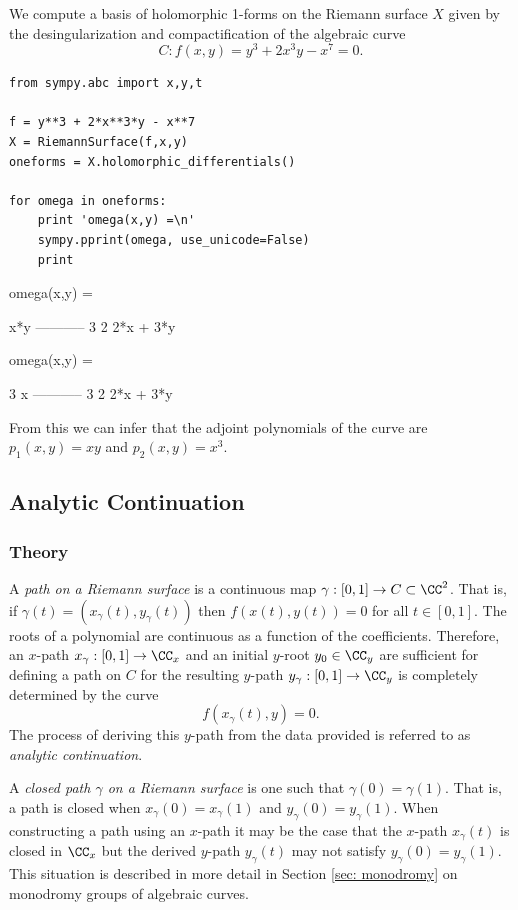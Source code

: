We compute a basis of holomorphic 1-forms on the Riemann surface $X$
given by the desingularization and compactification of the algebraic
curve
\[
    C : f(x,y) = y^3 + 2x^3y - x^7 = 0.
\]
\begin{lstlisting}
from sympy.abc import x,y,t

f = y**3 + 2*x**3*y - x**7
X = RiemannSurface(f,x,y)
oneforms = X.holomorphic_differentials()

for omega in oneforms:
    print 'omega(x,y) =\n'
    sympy.pprint(omega, use_unicode=False)
    print
\end{lstlisting}
\begin{pyoutput}
omega(x,y) =

    x*y    
-----------
   3      2
2*x  + 3*y 

omega(x,y) =

      3    
     x     
-----------
   3      2
2*x  + 3*y
\end{pyoutput}
From this we can infer that the adjoint polynomials of the curve are
$p_1(x,y) = xy$ and $p_2(x,y) = x^3$.


\subsection{Analytic Continuation} \label{sec: analytic-continuation}

%
\subsubsection*{Theory}
%

A {\it path on a Riemann surface} is a continuous map $\gamma : [0,1]
\to C \subset \CC^2$. That is, if $\gamma(t) = (x_\gamma(t),
y_\gamma(t))$ then $f(x(t),y(t)) = 0$ for all $t \in [0,1]$. The roots
of a polynomial are continuous as a function of the
coefficients. Therefore, an $x$-path $x_\gamma : [0,1] \to \CC_x$ and an
initial $y$-root $y_0 \in \CC_y$ are sufficient for defining a path on
$C$ for the resulting $y$-path $y_\gamma : [0,1] \to \CC_y$ is
completely determined by the curve
\[
    f(x_\gamma(t),y) = 0.
\]
The process of deriving this $y$-path from the data provided is
referred to as {\it analytic continuation}.

A {\it closed path $\gamma$ on a Riemann surface} is one such that
$\gamma(0) = \gamma(1)$. That is, a path is closed when $x_\gamma(0) =
x_\gamma(1)$ and $y_\gamma(0) = y_\gamma(1)$. When constructing a path
using an $x$-path it may be the case that the $x$-path $x_\gamma(t)$ is
closed in $\CC_x$ but the derived $y$-path $y_\gamma(t)$ may not satisfy
$y_\gamma(0) = y_\gamma(1)$. This situation is described in more detail
in Section \ref{sec: monodromy} on monodromy groups of algebraic curves.

